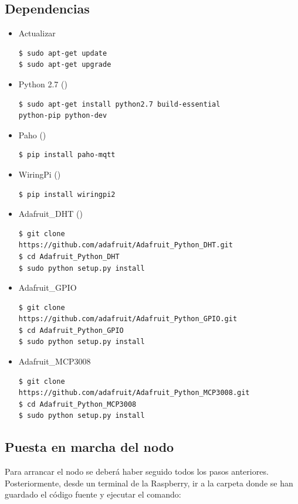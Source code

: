 \subsection{Dependencias}
\label{makereference7.1.4}
	\begin{itemize}
		\item Actualizar
\lstset{language=bash}
\begin{lstlisting}[frame=single]
$ sudo apt-get update
$ sudo apt-get upgrade
\end{lstlisting}
		\item Python 2.7 (\cite{ARP:Python:2017})
\begin{lstlisting}[frame=single]
$ sudo apt-get install python2.7 build-essential 
python-pip python-dev
\end{lstlisting}
		\item Paho (\cite{ARP:Paho:2017})
\begin{lstlisting}[frame=single]
$ pip install paho-mqtt
\end{lstlisting}
		\item WiringPi (\cite{ARP:Wiring:2017})
\begin{lstlisting}[frame=single]
$ pip install wiringpi2
\end{lstlisting}
		\item Adafruit\_DHT (\cite{ARP:Adafruit:2017})
\begin{lstlisting}[frame=single]
$ git clone 
https://github.com/adafruit/Adafruit_Python_DHT.git
$ cd Adafruit_Python_DHT
$ sudo python setup.py install
\end{lstlisting}
		\item Adafruit\_GPIO
\begin{lstlisting}[frame=single]
$ git clone 
https://github.com/adafruit/Adafruit_Python_GPIO.git
$ cd Adafruit_Python_GPIO
$ sudo python setup.py install
\end{lstlisting}
		\item Adafruit\_MCP3008
\begin{lstlisting}[frame=single]
$ git clone 
https://github.com/adafruit/Adafruit_Python_MCP3008.git
$ cd Adafruit_Python_MCP3008
$ sudo python setup.py install
\end{lstlisting}
	\end{itemize}

\subsection{Puesta en marcha del nodo}
\label{makereference7.1.5}
Para arrancar el nodo se deberá haber seguido todos los pasos anteriores. Posteriormente, desde un terminal de la Raspberry, ir a la carpeta donde se han guardado el código fuente y ejecutar el comando: 


